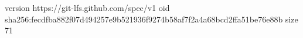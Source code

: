 version https://git-lfs.github.com/spec/v1
oid sha256:fecdfba882f07d494257e9b521936f9274b58af7f2a4a68bcd2ffa51be76e88b
size 71
